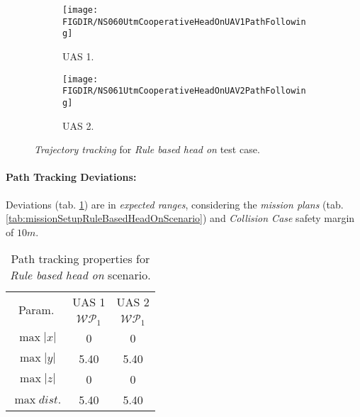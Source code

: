 \begin{figure}[H]
	\centering
    \begin{subfigure}{0.48\textwidth}
    	\centering
        \texttt{[image: \\FIGDIR/NS060UtmCooperativeHeadOnUAV1PathFollowing]}
        \caption{UAS 1.}
        \label{fig:ruleBasedHeadOnUAS1PathTracking}
    \end{subfigure}
    \begin{subfigure}{0.48\textwidth}
    	\centering
        \texttt{[image: \\FIGDIR/NS061UtmCooperativeHeadOnUAV2PathFollowing]} 
        \caption{UAS 2.}
        \label{fig:ruleBasedHeadOnUAS2PathTracking}
    \end{subfigure}
    \caption{\emph{Trajectory tracking} for \emph{Rule based head on} test case. }
    \label{fig:ruleBasedHeadOnTrajectoryTrackingPerformance}
\end{figure}

\paragraph{Path Tracking Deviations:} Deviations (tab. \ref{tab:pathTrackingParametersForRuleBasedHeadOn}) are in \emph{expected ranges}, considering the \emph{mission plans} (tab. \ref{tab:missionSetupRuleBasedHeadOnScenario}) and \emph{Collision Case} safety margin of $10 m$.

\begin{table}[H]
    \centering
    \begin{tabular}{c||c|c}
        \multirow{2}{*}{Param.} & UAS 1     & UAS 2              \\\cline{2-3}
                        & $\mathscr{WP}_1$  & $\mathscr{WP}_1$   \\\hline\hline
          $\max |x|$    & 0                 & 0                  \\\hline
          $\max |y|$    & 5.40              & 5.40              \\\hline
          $\max |z|$    & 0                 & 0                  \\\hline
          $\max dist.$  & 5.40              & 5.40              \\
    \end{tabular}
    \caption{Path tracking properties for \emph{Rule based head on} scenario.}
    \label{tab:pathTrackingParametersForRuleBasedHeadOn}
\end{table}